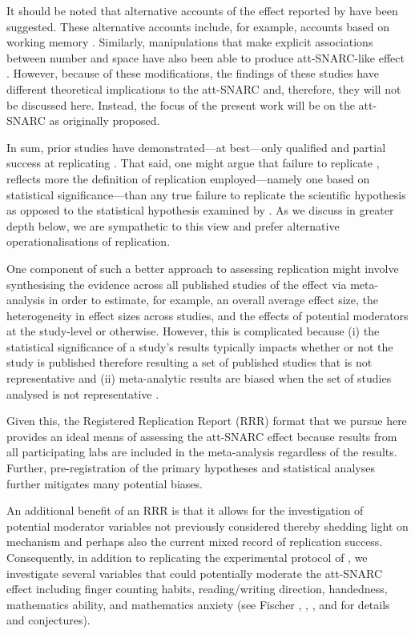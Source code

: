 \documentclass[A4paper,man,floatsintext]{apa6}
\theoremstyle{definition}
\theoremstyle{definition}
\theoremstyle{definition}
\theoremstyle{remark}
\begin{document}
It should be noted that alternative accounts of the effect reported by
\textcite{Fischer:2003ju} have been suggested. These alternative
accounts include, for example, accounts based on working memory
\autocite{vanDijck2014}. Similarly, manipulations that make explicit
associations between number and space have also been able to produce
att-SNARC-like effect \autocite[e.g.,][Experiment 3]{Fattorini2015}.
However, because of these modifications, the findings of these studies
have different theoretical implications to the att-SNARC and, therefore,
they will not be discussed here. Instead, the focus of the present work
will be on the att-SNARC as originally proposed.

In sum, prior studies have demonstrated---at best---only qualified and
partial success at replicating \textcite{Fischer:2003ju}. That said, one
might argue that failure to replicate \textcite{Fischer:2003ju},
reflects more the definition of replication employed---namely one based
on statistical significance---than any true failure to replicate the
scientific hypothesis as opposed to the statistical hypothesis examined
by \textcite{Fischer:2003ju}. As we discuss in greater depth below, we
are sympathetic to this view and prefer alternative operationalisations
of replication.

One component of such a better approach to assessing replication might
involve synthesising the evidence across all published studies of the
effect via meta-analysis in order to estimate, for example, an overall
average effect size, the heterogeneity in effect sizes across studies,
and the effects of potential moderators at the study-level or otherwise.
However, this is complicated because (i) the statistical significance of
a study's results typically impacts whether or not the study is
published therefore resulting a set of published studies that is not
representative and (ii) meta-analytic results are biased when the set of
studies analysed is not representative
\autocites{McSBocHan16}{ioannidis:eff}.

Given this, the Registered Replication Report (RRR) format that we
pursue here provides an ideal means of assessing the att-SNARC effect
because results from all participating labs are included in the
meta-analysis regardless of the results. Further, pre-registration of
the primary hypotheses and statistical analyses further mitigates many
potential biases.

An additional benefit of an RRR is that it allows for the investigation
of potential moderator variables not previously considered thereby
shedding light on mechanism and perhaps also the current mixed record of
replication success. Consequently, in addition to replicating the
experimental protocol of \textcite{Fischer:2003ju}, we investigate
several variables that could potentially moderate the att-SNARC effect
including finger counting habits, reading/writing direction, handedness,
mathematics ability, and mathematics anxiety (see Fischer
\autocites{Fischer:2006er}{Fischer:2008bv}, \textcite{Fischer:2014kz},
\textcite{Georges:2016gn}, and \textcite{Shaki:2009ch} for details and
conjectures).
\end{document}
